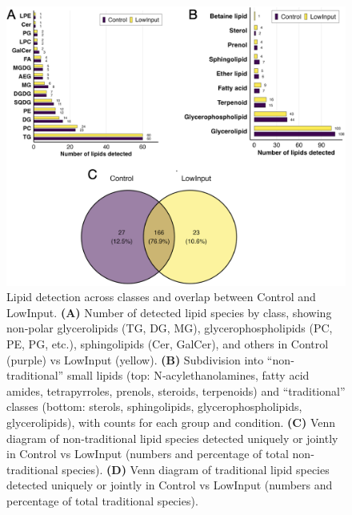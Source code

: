 \documentclass[10pt,letterpaper]{article}
\begin{document}
\begin{figure}[htbp]
  \centering
  \includegraphics[width=\textwidth]{fig/supp/SuppFig_3.png}
  \caption{Lipid detection across classes and overlap between Control and LowInput.  
    \textbf{(A)} Number of detected lipid species by class, showing non‐polar glycerolipids (TG, DG, MG), glycerophospholipids (PC, PE, PG, etc.), sphingolipids (Cer, GalCer), and others in Control (purple) vs LowInput (yellow).  
    \textbf{(B)} Subdivision into “non‐traditional” small lipids (top: N‐acylethanolamines, fatty acid amides, tetrapyrroles, prenols, steroids, terpenoids) and “traditional” classes (bottom: sterols, sphingolipids, glycerophospholipids, glycerolipids), with counts for each group and condition.  
    \textbf{(C)} Venn diagram of non‐traditional lipid species detected uniquely or jointly in Control vs LowInput (numbers and percentage of total non‐traditional species).  
    \textbf{(D)} Venn diagram of traditional lipid species detected uniquely or jointly in Control vs LowInput (numbers and percentage of total traditional species).}
  \label{fig:S3}
\end{figure}





\end{document}

